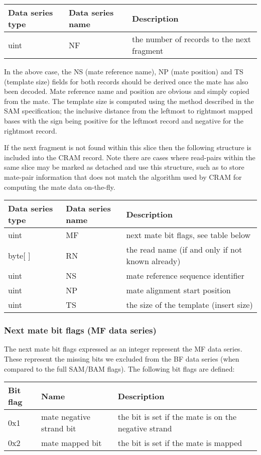 \documentclass[a4paper]{article}
\begin{document}
\begin{tabular}{|>{\raggedright}p{68pt}|>{\raggedright}p{115pt}|>{\raggedright}p{228pt}|}
\hline
\textbf{Data series type} & \textbf{Data series name} & \textbf{Description}\tabularnewline
\hline
uint & NF & the number of records to the next fragment\tabularnewline
\hline
\end{tabular}

In the above case, the NS (mate reference name), NP (mate position) and TS (template size) fields for both records should be derived once the mate has also been decoded.
Mate reference name and position are obvious and simply copied from the mate.
The template size is computed using the method described in the SAM specification; the inclusive distance from the leftmost to rightmost mapped bases with the sign being positive for the leftmost record and negative for the rightmost record.

If the next fragment is not found within this slice then the following structure is included into the CRAM record.
Note there are cases where read-pairs within the same slice may be marked as detached and use this structure, such as to store mate-pair information that does not match the algorithm used by CRAM for computing the mate data on-the-fly.

\begin{tabular}{|>{\raggedright}p{66pt}|>{\raggedright}p{117pt}|>{\raggedright}p{228pt}|}
\hline
\textbf{Data series type} & \textbf{Data series name} & \textbf{Description}\tabularnewline
\hline
uint & MF & next mate bit flags, see table below\tabularnewline
\hline
byte[ ] & RN & the read name (if and only if not known already)\tabularnewline
\hline
uint & NS & mate reference sequence identifier \tabularnewline
\hline
uint & NP & mate alignment start position \tabularnewline
\hline
uint & TS & the size of the template (insert size)\tabularnewline
\hline
\end{tabular}

\subsubsection*{Next mate bit flags (MF data series)}

The next mate bit flags expressed as an integer represent the MF data series.
These represent the missing bits we excluded from the BF data series (when compared to the full SAM/BAM flags).
The following bit flags are defined:

\begin{tabular}{|>{\raggedright}p{47pt}|>{\raggedright}p{134pt}|>{\raggedright}p{250pt}|}
\hline
\textbf{Bit flag} & \textbf{Name} & \textbf{Description}\tabularnewline
\hline
0x1 & mate negative strand bit & the bit is set if the mate is on the negative
strand\tabularnewline
\hline
0x2 & mate mapped bit & the bit is set if the mate is mapped\tabularnewline
\hline
\end{tabular}
\end{document}
